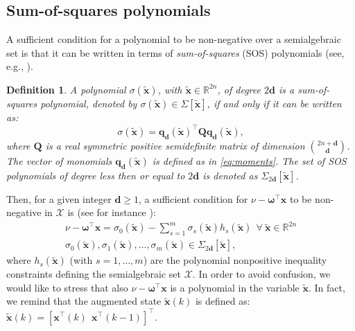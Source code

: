 \documentclass[twocolumn]{autart}
\newtheorem{definition}{Definition}
\newcommand{\DP}[1]{{#1}}
\newcommand{\xaug}{\tilde{\mathbf{x}}}
\newcommand{\relorder}{\DP{\mathbf{d}}}
\begin{document}
\subsection{Sum-of-squares polynomials} \label{subsec:SOS}
A sufficient condition for a polynomial to be non-negative over a semialgebraic set
is that it can be written in terms of \emph{sum-of-squares} (SOS) polynomials (see, e.g., \cite{2003Apa}).
\begin{definition}
 A polynomial $\sigma(\xaug)$, with  $\xaug \in \mathbb{R}^{2n}$, of degree $2\relorder$ is a sum-of-squares polynomial, denoted by $\sigma(\xaug) \in \Sigma [\xaug]$, if and only if it can be written as:
   \begin{equation} \label{eqn:SOSdef}
  \sigma(\xaug)=\mathbf{q}_\relorder(\xaug)^\top \mathbf{Q} \mathbf{q}_\relorder(\xaug), %
 \end{equation}
 where $\mathbf{Q}$  is  a real symmetric positive semidefinite matrix of dimension ${2n+\relorder \choose \relorder}$. The vector of monomials $\mathbf{q}_\relorder(\xaug)$ is defined as in \eqref{eq:moments}. The set of SOS polynomials of degree less then or equal to $2\relorder$ is denoted as $\Sigma_{2\relorder}[\xaug]$.
%
\end{definition}
Then, for a given integer $\relorder \geq 1$, a sufficient condition for $\nu-\boldsymbol{\omega}^\top   \mathbf{x}$ to be non-negative in $\mathcal{X}$ is (see for instance \cite[Ch. 4]{lasserre2010moments}):
  \begin{equation} \label{opt:algappSDPv3}
   \begin{array}{l}
\nu - \boldsymbol{\omega}^\top   \mathbf{x}   =\sigma_0(\xaug)-\sum\limits_{s=1}^m \sigma_s(\xaug) h_s(\xaug)~~\forall~\xaug \in \mathbb{R}^{2n}\\
   \sigma_0(\xaug), \sigma_1(\xaug), \ldots, \sigma_m(\xaug) \in \Sigma_{2\relorder}[\xaug], %
   \end{array}
    \end{equation}
  where $h_s(\xaug)$ (with $s=1,\ldots,m$) are the polynomial nonpositive inequality constraints defining the semialgebraic set $\mathcal{X}$. In order to avoid confusion, we would like to stress that also $\nu - \boldsymbol{\omega}^\top  \mathbf{x}$ is a polynomial in the variable $\xaug$. \DP{In fact,} we remind that the augmented state  $\xaug(k)$ is defined as: $\xaug(k)=\left[\mathbf{x}^\top(k) \ \ \mathbf{x}^\top(k-1)\right]^\top$.
\end{document}
